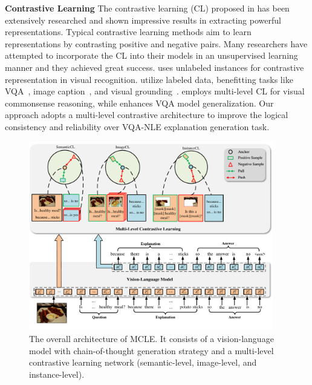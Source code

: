 \documentclass[letterpaper]{article} %
\begin{document}
\noindent
\textbf{Contrastive Learning} The contrastive learning (CL) proposed in \cite{hadsell2006dimensionality} has been extensively researched and shown impressive results in extracting powerful representations. Typical contrastive learning methods aim to learn representations by contrasting positive and negative pairs. Many researchers have attempted to incorporate the CL into their models in an unsupervised learning manner and they achieved great success. \cite{dosovitskiy2014discriminative} uses unlabeled instances for contrastive representation in visual recognition. \cite{khosla2020supervised,tian2020makes} utilize labeled data, benefitting tasks like VQA~\cite{kim2021self,liang2020learning}, image caption~\cite{dai2017contrastive,li2020context}, and visual grounding~\cite{zhang2020counterfactual}. \cite{zhang2021multi} employs multi-level CL for visual commonsense reasoning, while \cite{liang2020learning} enhances VQA model generalization. Our approach adopts a multi-level contrastive architecture to improve the logical consistency and reliability over VQA-NLE explanation generation task.


\begin{figure}[t]
	\centering
	\includegraphics[width=0.95\textwidth]{frame.pdf} %
	\caption{The overall architecture of MCLE. It consists of a vision-language model with chain-of-thought generation strategy and a multi-level contrastive learning network (semantic-level, image-level, and instance-level).}
	\label{frame}
\end{figure}
\end{document}
